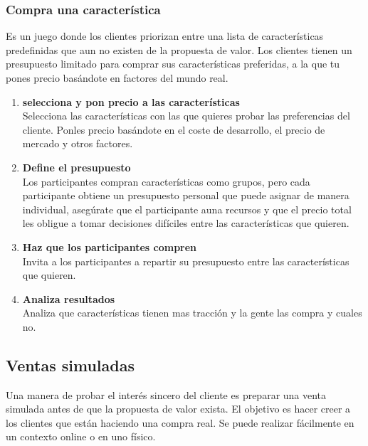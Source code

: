 \documentclass[11pt]{book}
\begin{document}
\subsubsection{Compra una característica}
Es un juego donde los clientes priorizan entre una lista de características predefinidas que aun no existen de la propuesta de valor. Los clientes tienen un presupuesto limitado para comprar sus características preferidas, a la que tu pones precio basándote en factores del mundo real.
\begin{enumerate}
\item \textbf{ selecciona y pon precio a las características }\\
Selecciona las características con las que quieres probar las preferencias del cliente. Ponles precio basándote en el coste de desarrollo, el precio de mercado y otros factores. 
\item \textbf{ Define el presupuesto }\\
Los participantes compran características como grupos, pero cada participante obtiene un presupuesto personal que puede asignar de manera individual, asegúrate que el participante auna recursos y que el precio total les obligue a tomar decisiones difíciles entre las características que quieren.
\item \textbf{ Haz que los participantes compren }\\
Invita a los participantes a repartir su presupuesto entre las características que quieren.
\item \textbf{ Analiza resultados }\\
Analiza que características tienen mas tracción y la gente las compra y cuales no.
\end{enumerate}
\subsection{Ventas simuladas}
Una manera de probar el interés sincero del cliente es preparar una venta simulada antes de que la propuesta de valor exista. El objetivo es hacer creer a los clientes que están haciendo una compra real. Se puede realizar fácilmente en un contexto online o en uno físico.
\end{document}

